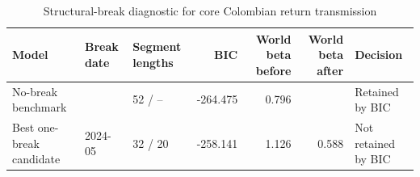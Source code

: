 \begin{table}
\caption{Structural-break diagnostic for core Colombian return transmission}
\label{tab:structural_breaks}
\begin{tabular}{lllrrrl}
\toprule
Model & Break date & Segment lengths & BIC & World beta before & World beta after & Decision \\
\midrule
No-break benchmark &  & 52 / -- & -264.475 & 0.796 &  & Retained by BIC \\
Best one-break candidate & 2024-05 & 32 / 20 & -258.141 & 1.126 & 0.588 & Not retained by BIC \\
\bottomrule
\end{tabular}
\end{table}
